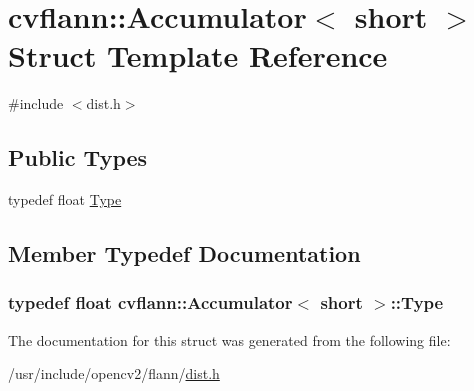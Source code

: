 \hypertarget{structcvflann_1_1Accumulator_3_01short_01_4}{\section{cvflann\-:\-:Accumulator$<$ short $>$ Struct Template Reference}
\label{structcvflann_1_1Accumulator_3_01short_01_4}
}


{\ttfamily \#include $<$dist.\-h$>$}

\subsection*{Public Types}
\begin{DoxyCompactItemize}
\item 
typedef float \hyperlink{structcvflann_1_1Accumulator_3_01short_01_4_a651c7f49bd1342a479b326806905afc1}{Type}
\end{DoxyCompactItemize}


\subsection{Member Typedef Documentation}
\hypertarget{structcvflann_1_1Accumulator_3_01short_01_4_a651c7f49bd1342a479b326806905afc1}{
\subsubsection[{Type}]{\setlength{\rightskip}{0pt plus 5cm}typedef float {\bf cvflann\-::\-Accumulator}$<$ short $>$\-::{\bf Type}}}\label{structcvflann_1_1Accumulator_3_01short_01_4_a651c7f49bd1342a479b326806905afc1}


The documentation for this struct was generated from the following file\-:\begin{DoxyCompactItemize}
\item 
/usr/include/opencv2/flann/\hyperlink{dist_8h}{dist.\-h}\end{DoxyCompactItemize}
